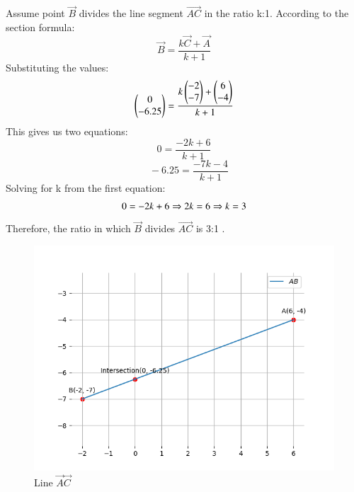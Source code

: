 \documentclass[journal]{IEEEtran}
\numberwithin{figure}{enumi}
\begin{document}
Assume point $\vec{B}$ divides the line segment $\vec{AC}$ in the ratio  k:1.  According to the section formula:
\begin{equation}
\vec{B} = \frac{k\vec{C}+\vec{A}}{k+1}
\end{equation}
Substituting the values:
\begin{equation}
\begin{pmatrix}0 \\ -6.25\end{pmatrix}  = \frac{k \begin{pmatrix}-2 \\ -7\end{pmatrix} +  \begin{pmatrix}6 \\ -4\end{pmatrix} }{k+1}
\end{equation}
This gives us two equations:
\begin{equation}
0 = \frac{-2k + 6}{k+1} 
\end{equation}
\begin{equation}
\quad -6.25 = \frac{-7k - 4}{k+1}
\end{equation}
Solving for k from the first equation:
\begin{equation}
0 = -2k + 6 \\
\Rightarrow  2k = 6 \\
\Rightarrow k = 3 \\
\end{equation}
Therefore, the ratio in which  $\vec{B}$  divides $\vec{AC}$ is  3:1 .
\begin{figure}[h!]
	\centering
	\includegraphics[width=0.5\linewidth]{figs/Figure_1.png}
	\caption{ Line $\vec{A}\vec{C}$}
	\label{stemplot}
\end{figure}	
\end{document}
